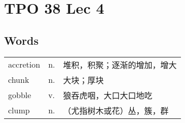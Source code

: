 \section{TPO 38 Lec 4}

\subsection{Words}

\begin{tabular}{lll}
    accretion & n. & 堆积，积聚；逐渐的增加，增大 \\
    chunk     & n. & 大块；厚块          \\
    gobble    & v. & 狼吞虎咽，大口大口地吃    \\
    clump     & n. & （尤指树木或花）丛，簇，群  \\
\end{tabular}

